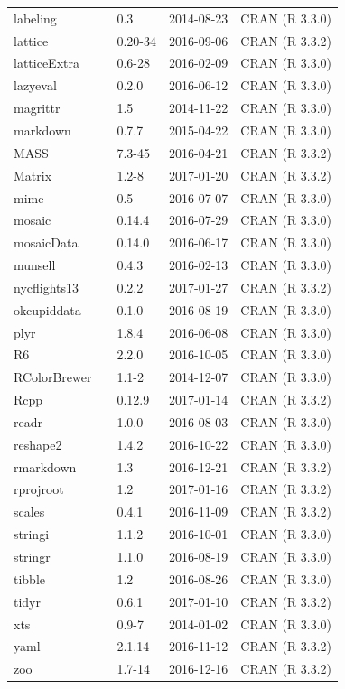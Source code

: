 \documentclass[]{tufte-book}
\begin{document}
\begin{longtable}{lllll}
labeling &  & 0.3 & 2014-08-23 & CRAN (R 3.3.0)\\
lattice &  & 0.20-34 & 2016-09-06 & CRAN (R 3.3.2)\\
latticeExtra &  & 0.6-28 & 2016-02-09 & CRAN (R 3.3.0)\\
lazyeval &  & 0.2.0 & 2016-06-12 & CRAN (R 3.3.0)\\
\addlinespace
magrittr &  & 1.5 & 2014-11-22 & CRAN (R 3.3.0)\\
markdown &  & 0.7.7 & 2015-04-22 & CRAN (R 3.3.0)\\
MASS &  & 7.3-45 & 2016-04-21 & CRAN (R 3.3.2)\\
Matrix &  & 1.2-8 & 2017-01-20 & CRAN (R 3.3.2)\\
mime &  & 0.5 & 2016-07-07 & CRAN (R 3.3.0)\\
\addlinespace
mosaic &  & 0.14.4 & 2016-07-29 & CRAN (R 3.3.0)\\
mosaicData &  & 0.14.0 & 2016-06-17 & CRAN (R 3.3.0)\\
munsell &  & 0.4.3 & 2016-02-13 & CRAN (R 3.3.0)\\
nycflights13 &  & 0.2.2 & 2017-01-27 & CRAN (R 3.3.2)\\
okcupiddata &  & 0.1.0 & 2016-08-19 & CRAN (R 3.3.0)\\
\addlinespace
plyr &  & 1.8.4 & 2016-06-08 & CRAN (R 3.3.0)\\
R6 &  & 2.2.0 & 2016-10-05 & CRAN (R 3.3.0)\\
RColorBrewer &  & 1.1-2 & 2014-12-07 & CRAN (R 3.3.0)\\
Rcpp &  & 0.12.9 & 2017-01-14 & CRAN (R 3.3.2)\\
readr &  & 1.0.0 & 2016-08-03 & CRAN (R 3.3.0)\\
\addlinespace
reshape2 &  & 1.4.2 & 2016-10-22 & CRAN (R 3.3.0)\\
rmarkdown &  & 1.3 & 2016-12-21 & CRAN (R 3.3.2)\\
rprojroot &  & 1.2 & 2017-01-16 & CRAN (R 3.3.2)\\
scales &  & 0.4.1 & 2016-11-09 & CRAN (R 3.3.2)\\
stringi &  & 1.1.2 & 2016-10-01 & CRAN (R 3.3.0)\\
\addlinespace
stringr &  & 1.1.0 & 2016-08-19 & CRAN (R 3.3.0)\\
tibble &  & 1.2 & 2016-08-26 & CRAN (R 3.3.0)\\
tidyr &  & 0.6.1 & 2017-01-10 & CRAN (R 3.3.2)\\
xts &  & 0.9-7 & 2014-01-02 & CRAN (R 3.3.0)\\
yaml &  & 2.1.14 & 2016-11-12 & CRAN (R 3.3.2)\\
zoo &  & 1.7-14 & 2016-12-16 & CRAN (R 3.3.2)\\
\bottomrule
\end{longtable}
\end{document}
